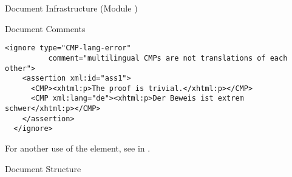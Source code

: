 \begin{tchapter}[id=omdoc-infrastructure,short=Document Infrastructure]{Document Infrastructure (Module {})}
\begin{tsection}[id=comments]{Document Comments}
\begin{lstlisting}[label=lst:ignore-error,
  caption={Marking up Mathematical Errors Using {\element{ignore}}},
  numbers=none,index={ignore}]
  <ignore type="CMP-lang-error" 
          comment="multilingual CMPs are not translations of each other">
    <assertion xml:id="ass1">
      <CMP><xhtml:p>The proof is trivial.</xhtml:p></CMP>
      <CMP xml:lang="de"><xhtml:p>Der Beweis ist extrem schwer</xhtml:p></CMP>
    </assertion>
  </ignore>
\end{lstlisting}    
For another use of the {} element, see {} in
{}.
\end{tsection}

\begin{tsection}[id=sectioning]{Document Structure}


\end{tsection}
\end{tchapter}

